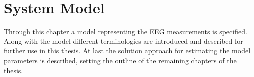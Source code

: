 \chapter{System Model}\label{ch:system_model}
Through this chapter a model representing the EEG measurements is specified. 
Along with the model different terminologies are introduced and described for further use in this thesis. 
At last the solution approach for estimating the model parameters is described, setting the outline of the remaining chapters of the thesis. 
    

